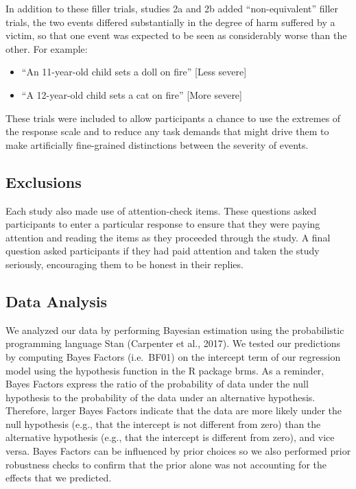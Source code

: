 \documentclass[10pt, letterpaper]{article}
\begin{document}
In addition to these filler trials, studies 2a and 2b added
``non-equivalent'' filler trials, the two events differed substantially
in the degree of harm suffered by a victim, so that one event was
expected to be seen as considerably worse than the other. For example:

\begin{itemize}
\item
  ``An 11-year-old child sets a doll on fire'' {[}Less severe{]}
\item
  ``A 12-year-old child sets a cat on fire'' {[}More severe{]}
\end{itemize}

These trials were included to allow participants a chance to use the
extremes of the response scale and to reduce any task demands that might
drive them to make artificially fine-grained distinctions between the
severity of events.

\subsection{Exclusions}\label{exclusions}

Each study also made use of attention-check items. These questions asked
participants to enter a particular response to ensure that they were
paying attention and reading the items as they proceeded through the
study. A final question asked participants if they had paid attention
and taken the study seriously, encouraging them to be honest in their
replies.

\subsection{Data Analysis}\label{data-analysis}

We analyzed our data by performing Bayesian estimation using the
probabilistic programming language Stan (Carpenter et al., 2017). We
tested our predictions by computing Bayes Factors (i.e.~BF01) on the
intercept term of our regression model using the hypothesis function in
the R package brms. As a reminder, Bayes Factors express the ratio of
the probability of data under the null hypothesis to the probability of
the data under an alternative hypothesis. Therefore, larger Bayes
Factors indicate that the data are more likely under the null hypothesis
(e.g., that the intercept is not different from zero) than the
alternative hypothesis (e.g., that the intercept is different from
zero), and vice versa. Bayes Factors can be influenced by prior choices
so we also performed prior robustness checks to confirm that the prior
alone was not accounting for the effects that we predicted.
\end{document}
